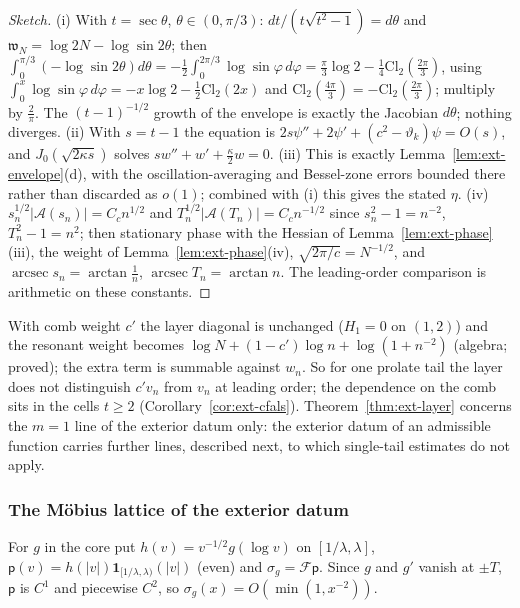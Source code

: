 \documentclass[11pt]{amsart}
\theoremstyle{definition}
\theoremstyle{remark}
\begin{document}
\begin{proof}[Sketch]
(i) With $t=\sec\theta$, $\theta\in(0,\pi/3)$: $dt/(t\sqrt{t^2-1})=d\theta$ and $\mathfrak w_N=\log2N-\log\sin2\theta$; then
$\int_0^{\pi/3}(-\log\sin2\theta)d\theta=-\frac12\int_0^{2\pi/3}\log\sin\varphi\,d\varphi=\frac\pi3\log2-\frac14\mathrm{Cl}_2(\frac{2\pi}3)$, using
$\int_0^x\log\sin\varphi\,d\varphi=-x\log2-\frac12\mathrm{Cl}_2(2x)$ and $\mathrm{Cl}_2(\frac{4\pi}3)=-\mathrm{Cl}_2(\frac{2\pi}3)$; multiply by $\frac2\pi$.
The $(t-1)^{-1/2}$ growth of the envelope is exactly the Jacobian $d\theta$; nothing diverges. (ii) With $s=t-1$ the equation is
$2s\psi''+2\psi'+(c^2-\vartheta_k)\psi=O(s)$, and $J_0(\sqrt{2\kappa s})$ solves $sw''+w'+\frac\kappa2w=0$. (iii) This is exactly
Lemma~\ref{lem:ext-envelope}(d), with the oscillation-averaging and Bessel-zone errors bounded there rather than
discarded as $o(1)$; combined with (i) this gives the stated $\eta$. (iv) $s_n^{1/2}|\mathcal A(s_n)|=C_cn^{1/2}$ and $T_n^{1/2}|\mathcal A(T_n)|=C_cn^{-1/2}$
since $s_n^2-1=n^{-2}$, $T_n^2-1=n^2$; then stationary phase \cite[Ch.~VIII]{Stein1993} with the Hessian of
Lemma~\ref{lem:ext-phase}(iii), the weight of Lemma~\ref{lem:ext-phase}(iv), $\sqrt{2\pi/c}=N^{-1/2}$, and
$\operatorname{arcsec}s_n=\arctan\frac1n$, $\operatorname{arcsec}T_n=\arctan n$. The leading-order comparison is
arithmetic on these constants.
\end{proof}

With comb weight $c'$ the layer diagonal is unchanged ($H_1=0$ on $(1,2)$) and the resonant weight becomes
$\log N+(1-c')\log n+\log(1+n^{-2})$ (algebra; proved); the extra term is summable against $w_n$. So for one prolate tail the layer
does not distinguish $c'v_n$ from $v_n$ at leading order; the dependence on the comb sits in the cells $t\ge2$
(Corollary~\ref{cor:ext-cfals}). Theorem~\ref{thm:ext-layer} concerns the $m=1$ line of the exterior datum only: the exterior
datum of an admissible function carries further lines, described next, to which single-tail estimates do not apply.

\subsubsection*{The M\"obius lattice of the exterior datum}

For $g$ in the core put $h(v)=v^{-1/2}g(\log v)$ on $[1/\lambda,\lambda]$, $\mathsf p(v)=h(|v|)\mathbf 1_{[1/\lambda,\lambda)}(|v|)$ (even) and
$\sigma_g=\mathcal F\mathsf p$. Since $g$ and $g'$ vanish at $\pm T$, $\mathsf p$ is $C^1$ and piecewise $C^2$, so $\sigma_g(x)=O(\min(1,x^{-2}))$.
\end{document}
